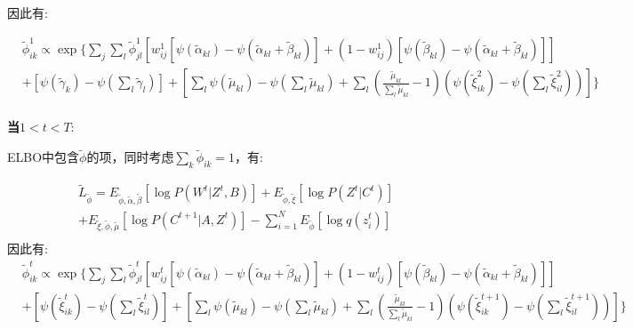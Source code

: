 因此有:

\begin{equation}
\label{eq8}
\begin{split}
&\widetilde{\phi}_{ik}^1 \propto \exp\{\sum_j \sum_l \widetilde{\phi}_{jl}^1 [w_{ij}^1[\psi(\widetilde{\alpha}_{kl})-\psi(\widetilde{\alpha}_{kl}+\widetilde{\beta}_{kl})]
  + (1-w_{ij}^1)[\psi(\widetilde{\beta}_{kl}) - \psi(\widetilde{\alpha}_{kl}+\widetilde{\beta}_{kl})] ]   \\
& +[\psi(\widetilde{\gamma}_k)-\psi(\sum_l \widetilde{\gamma}_l) ] +[\sum_l \psi(\widetilde{\mu}_{kl}) - \psi(\sum_l \widetilde{\mu}_{kl}) 
+ \sum_l (\frac{\widetilde{\mu}_{kl}}{\sum_l \widetilde{\mu}_{kl}}-1)(\psi (\widetilde{\xi}_{ik}^2) - \psi(\sum_l \widetilde{\xi}_{il}^2))]  \} \\
\end{split}
\end{equation}

\textbf{当$1<t<T$}:

ELBO中包含$\widetilde{\phi}$的项，同时考虑$\sum_k \widetilde{\phi}_{ik} = 1 $，有:

\begin{equation}
\begin{split}
& \widetilde{L}_{\widetilde{\phi}} = E_{\widetilde{\phi},\widetilde{\alpha},\widetilde{\beta}} [\log P(W^t|Z^t,B)]+E_{\widetilde{\phi},\widetilde{\xi}} [\log P(Z^t|C^t)]\\
&+  E_{\widetilde{\xi},\widetilde{\phi},\widetilde{\mu}} [\log P(C^{t+1}|A,Z^t)]- \sum_{i=1}^N E_{\widetilde{\phi}}[\log q(z_i^t)]\\
\end{split}
\end{equation}
因此有:
\begin{equation}
\label{eq9}
\begin{split}
&\widetilde{\phi}_{ik}^t \propto \exp \{ \sum_j \sum_l \widetilde{\phi}_{jl}^t [w_{ij}^t[\psi(\widetilde{\alpha}_{kl}) - \psi(\widetilde{\alpha}_{kl}+\widetilde{\beta}_{kl})]
+ (1-w_{ij}^t)[\psi(\widetilde{\beta}_{kl})-\psi(\widetilde{\alpha}_{kl}+\widetilde{\beta}_{kl})]]    \\
& + [\psi(\widetilde{\xi}_{ik}^t) - \psi(\sum_l \widetilde{\xi}_{il}^t)]+ [\sum_l \psi(\widetilde{\mu}_{kl}) - \psi(\sum_l \widetilde{\mu}_{kl}) 
+\sum_l (\frac{\widetilde{\mu}_{kl}}{\sum_l \widetilde{\mu}_{kl}} -1)(\psi(\widetilde{\xi}_{ik}^{t+1}) - \psi(\sum_l \widetilde{\xi}_{il}^{t+1}))]  \}\\
\end{split}
\end{equation} 

